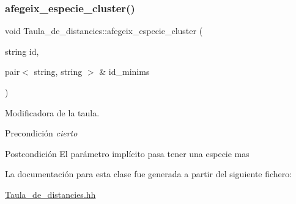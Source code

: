 \subsubsection{\texorpdfstring{afegeix\+\_\+especie\+\_\+cluster()}{afegeix\_especie\_cluster()}}
{\footnotesize\ttfamily void Taula\+\_\+de\+\_\+distancies\+::afegeix\+\_\+especie\+\_\+cluster (\begin{DoxyParamCaption}\item[{string}]{id,  }\item[{pair$<$ string, string $>$ \&}]{id\+\_\+minims }\end{DoxyParamCaption})}



Modificadora de la taula. 

\begin{DoxyPrecond}{Precondición}
{\itshape cierto} 
\end{DoxyPrecond}
\begin{DoxyPostcond}{Postcondición}
El parámetro implícito pasa tener una especie mas 
\end{DoxyPostcond}


La documentación para esta clase fue generada a partir del siguiente fichero\+:\begin{DoxyCompactItemize}
\item 
\hyperlink{_taula__de__distancies_8hh}{Taula\+\_\+de\+\_\+distancies.\+hh}\end{DoxyCompactItemize}
